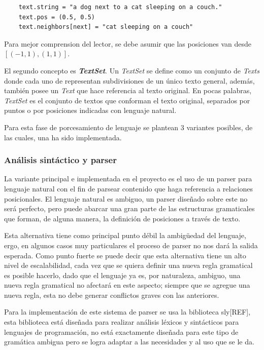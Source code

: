 \begin{verbatim}
    text.string = "a dog next to a cat sleeping on a couch."
    text.pos = (0.5, 0.5)
    text.neighbors[next] = "cat sleeping on a couch"
\end{verbatim}

Para mejor comprension del lector, se debe asumir que las posiciones van desde $[(-1,1), (1,1)]$.

El segundo concepto es \textit{\textbf{TextSet}}. Un \textit{TextSet} se define como un conjunto de \textit{Texts} donde cada uno de representan subdivisiones de un \'unico texto general, además, también posee un \textit{Text} que hace referencia al texto original. En pocas palabras, \textit{TextSet} es el conjunto de textos que conforman el texto original, separados por puntos o por posiciones indicadas con lenguaje natural.

Para esta fase de porcesamiento de lenguaje se plantean 3 variantes posibles, de las cuales, una ha sido implementada.

\subsubsection*{Análisis sintáctico y parser}
La variante principal e implementada en el proyecto es el uso de un parser para lenguaje natural con el fin de parsear contenido que haga referencia a relaciones posicionales. El lenguaje natural es ambiguo, un parser diseñado sobre este no será perfecto, pero puede abarcar una gran parte de las estructuras gramaticales que forman, de alguna manera, la definición de posiciones a través de texto.

Esta alternativa tiene como principal punto débil la ambigüedad del lenguaje, ergo, en algunos casos muy particulares el proceso de parser no nos dará la salida esperada. Como punto fuerte se puede decir que esta alternativa tiene un alto nivel de escalabilidad, cada vez que se quiera definir una nueva regla gramatical es posible hacerlo, dado que el lenguaje ya es, por naturaleza, ambiguo, una nueva regla gramatical no afectará en este aspecto; siempre que se agregue una nueva regla, esta no debe generar conflictos graves con las anteriores.

Para la implementación de este sistema de parser se usa la biblioteca sly[REF], esta biblioteca está diseñada para realizar análisis léxicos y sintácticos para lenguajes de programación, no está exactamente diseñada para este tipo de gramática ambigua pero se logra adaptar a las necesidades y al uso que se le da.

